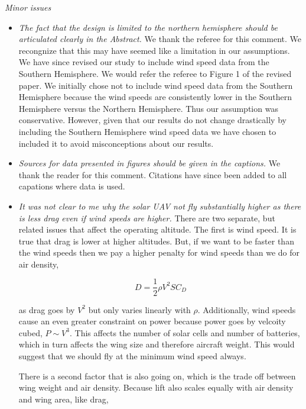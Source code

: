 \documentclass[10pt, a4paper]{article}
\begin{document}
\emph{Minor issues}
\begin{itemize}
    \item \emph{The fact that the design is limited to the northern hemisphere should be articulated clearly in the Abstract.}
        We thank the referee for this comment.  We recongnize that this may have seemed like a limitation in our assumptions.  We have since revised our study to include wind speed data from the Southern Hemisphere.  We would refer the referee to Figure 1 of the revised paper.  We initially chose not to include wind speed data from the Southern Hemisphere because the wind speeds are consistently lower in the Southern Hemisphere versus the Northern Hemisphere.  Thus our assumption was conservative.  However, given that our results do not change drastically by including the Southern Hemisphere wind speed data we have chosen to included it to avoid misconceptions about our results. 

    \item \emph{Sources for data presented in figures should be given in the captions.}
        We thank the reader for this comment.  Citations have since been added to all capations where data is used.  

    \item \emph{It was not clear to me why the solar UAV not fly substantially higher as there is less drag even if wind speeds are higher.}
    There are two separate, but related issues that affect the operating altitude.  The first is wind speed.  It is true that drag is lower at higher altitudes.  But, if we want to be faster than the wind speeds then we pay a higher penalty for wind speeds than we do for air density, 

    \begin{equation}
        D = \frac{1}{2} \rho V^2 S C_D
    \end{equation}
    
    as drag goes by $V^2$ but only varies linearly with $\rho$.  Additionally, wind speeds cause an even greater constraint on power because power goes by velcoity cubed, $P \sim V^3$.  This affects the number of solar cells and number of batteries, which in turn affects the wing size and therefore aircraft weight. This would suggest that we should fly at the minimum wind speed always.  

    There is a second factor that is also going on, which is the trade off between wing weight and air density.  Because lift also scales equally with air density and wing area, like drag, 


\end{itemize}
\end{document}
